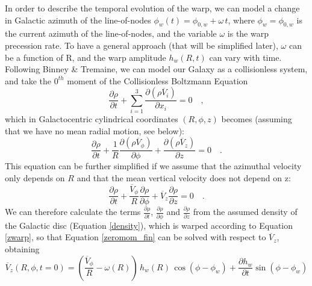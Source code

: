 \documentclass{nature}
\begin{document}
\begin{methods}
In order to describe the temporal evolution of the warp, we can model a change in Galactic azimuth of the line-of-nodes $\phi_w(t) = \phi_{0,w}  + \omega \, t$, where $\phi_w = \phi_{0,w}$ is the current azimuth of the line-of-nodes, and the variable $\omega$ is the warp precession rate. To have a general approach (that will be simplified later), $\omega$ can be a function of R, and the warp amplitude $h_w(R,t)$ can vary with time\cite{LopezCorredoira:2014}. Following Binney \& Tremaine\cite{Binney:2008}, we can model our Galaxy as a collisionless system, and take the $0^{th}$ moment of the Collisionless Boltzmann Equation
\begin {equation}
\label{zeromom}
\frac{\partial \rho}{\partial t} + \sum_{i=1}^{3} \frac{\partial (\rho \overline{V}_i )}{\partial x_i} = 0 \quad ,
\end{equation}
which in Galactocentric cylindrical coordinates $(R, \phi, z)$ becomes (assuming that we have no mean radial motion, see below): 
\begin {equation}
\label{zeromom_cyl}
\frac{\partial \rho}{\partial t}+ \frac{1}{R} \frac{\partial (\rho \overline{V}_\phi)}{\partial \phi}
                                               + \frac{\partial (\rho \overline{V}_z)}{\partial z} = 0 \quad .                        
\end{equation}                                               
This equation can be further simplified if we assume that the azimuthal velocity only depends on $R$ and that the mean vertical velocity does not depend on z:
\begin {equation}
\label{zeromom_fin}
\frac{\partial \rho}{\partial t}  + \frac{\overline{V}_\phi}{R} \frac{\partial \rho }{\partial \phi}
                                               + \overline{V}_z\frac{\partial \rho }{\partial z} = 0 \quad .                                                                  
\end{equation}
We can therefore calculate the terms $\frac{\partial \rho}{\partial t} $, $\frac{\partial \rho }{\partial \phi} $ and $\frac{\partial \rho }{\partial z} $ from the assumed density of the Galactic disc (Equation \ref{density}), which is warped according to Equation \ref{zwarp}, so that Equation \ref{zeromom_fin} can be solved with respect to $\overline{V}_z$, obtaining 
\begin {equation} 
\label{vz_general} 
\overline{V}_{z} (R,\phi, t=0)=\left(\frac{\overline{V}_\phi}{R} - \omega(R) \right) \, h_w(R) \, \cos{( \phi - \phi_w)} + \frac{ \partial h_w}{\partial t} \sin{( \phi - \phi_w)}

\end{equation}
\end{methods}
\end{document}
